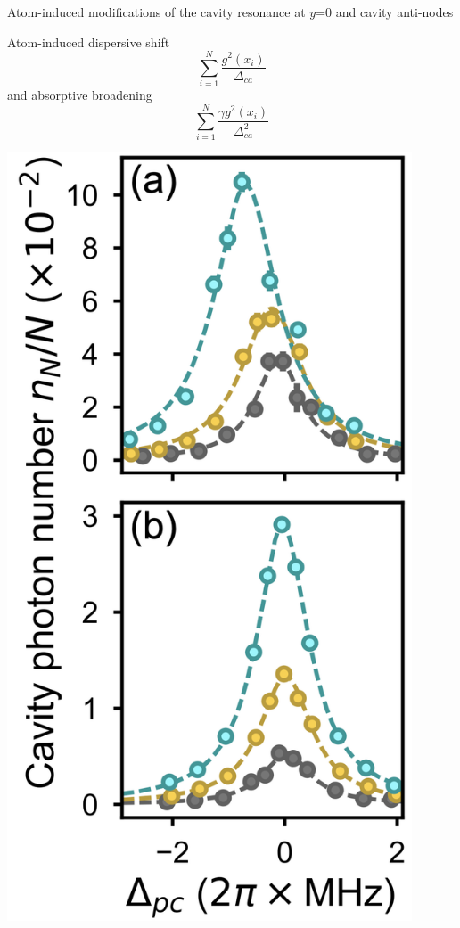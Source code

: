 \documentclass{beamer}
\begin{document}
\begin{frame}{Atom-induced modifications of the cavity resonance {\tiny at $y$=0 and cavity anti-nodes}}
	\begin{minipage}{0.38\textwidth}
		Atom-induced dispersive shift
		\begin{equation*}
			\sum_{i=1}^N \frac{g^2(x_i)}{\Delta_{ca}}
		\end{equation*}
		and absorptive broadening
		\begin{equation*}
			\sum_{i=1}^N\frac{\gamma g^2(x_i)}{\Delta^2_{ca}}
		\end{equation*}
	\end{minipage}
	\hfill
	\begin{minipage}{0.61\textwidth}
		\hspace{1.7em}
		\begin{minipage}{0.47\textwidth}
			\includegraphics[width=0.9\textwidth]{Figure_4a.png}

\end{minipage}
\end{minipage}
\end{frame}
\end{document}
